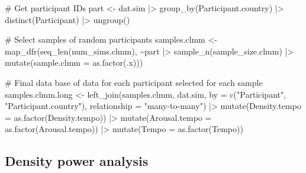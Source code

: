 \documentclass[
  bookmarksnumbered]{article}
\newenvironment{Shaded}{\begin{snugshade}}{\end{snugshade}}
\newcommand{\AttributeTok}[1]{\textcolor[rgb]{0.80,0.80,0.80}{#1}}
\newcommand{\CommentTok}[1]{\textcolor[rgb]{0.50,0.62,0.50}{#1}}
\newcommand{\FunctionTok}[1]{\textcolor[rgb]{0.94,0.94,0.56}{#1}}
\newcommand{\NormalTok}[1]{\textcolor[rgb]{0.80,0.80,0.80}{#1}}
\newcommand{\OtherTok}[1]{\textcolor[rgb]{0.94,0.94,0.56}{#1}}
\newcommand{\SpecialCharTok}[1]{\textcolor[rgb]{0.86,0.64,0.64}{#1}}
\newcommand{\StringTok}[1]{\textcolor[rgb]{0.80,0.58,0.58}{#1}}
\begin{document}
\begin{Shaded}
\begin{Highlighting}[]
\CommentTok{\# Get participant IDs}
\NormalTok{part }\OtherTok{\textless{}{-}}\NormalTok{ dat.sim  }\SpecialCharTok{|\textgreater{}} 
  \FunctionTok{group\_by}\NormalTok{(Participant.country) }\SpecialCharTok{|\textgreater{}}
  \FunctionTok{distinct}\NormalTok{(Participant) }\SpecialCharTok{|\textgreater{}}
  \FunctionTok{ungroup}\NormalTok{()}

\CommentTok{\# Select samples of random participants }
\NormalTok{samples.clmm }\OtherTok{\textless{}{-}} \FunctionTok{map\_dfr}\NormalTok{(}\FunctionTok{seq\_len}\NormalTok{(num\_sims.clmm), }\SpecialCharTok{\textasciitilde{}}\NormalTok{part }\SpecialCharTok{|\textgreater{}}
                        \FunctionTok{sample\_n}\NormalTok{(sample\_size.clmm) }\SpecialCharTok{|\textgreater{}}
                        \FunctionTok{mutate}\NormalTok{(}\AttributeTok{sample.clmm =} \FunctionTok{as.factor}\NormalTok{(.x)))}

\CommentTok{\# Final data base of data for each participant selected for each sample}
\NormalTok{samples.clmm.long }\OtherTok{\textless{}{-}} \FunctionTok{left\_join}\NormalTok{(samples.clmm, dat.sim, }\AttributeTok{by =} \FunctionTok{c}\NormalTok{(}\StringTok{"Participant"}\NormalTok{, }
                                                             \StringTok{"Participant.country"}\NormalTok{),}
                                \AttributeTok{relationship =} \StringTok{"many{-}to{-}many"}\NormalTok{) }\SpecialCharTok{|\textgreater{}}
  \FunctionTok{mutate}\NormalTok{(}\AttributeTok{Density.tempo =} \FunctionTok{as.factor}\NormalTok{(Density.tempo)) }\SpecialCharTok{|\textgreater{}}
  \FunctionTok{mutate}\NormalTok{(}\AttributeTok{Arousal.tempo =} \FunctionTok{as.factor}\NormalTok{(Arousal.tempo)) }\SpecialCharTok{|\textgreater{}}
  \FunctionTok{mutate}\NormalTok{(}\AttributeTok{Tempo =} \FunctionTok{as.factor}\NormalTok{(Tempo))}
\end{Highlighting}
\end{Shaded}

\hypertarget{density-power-analysis}{%
\subsection{Density power analysis}\label{density-power-analysis}}
\end{document}
